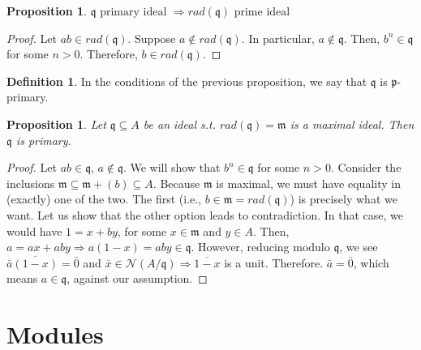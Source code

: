 \documentclass[11pt]{article}
\newtheorem{prop}[theorem]{Proposition}
\theoremstyle{definition}
\newtheorem{defn}[theorem]{Definition}
\begin{document}
        \begin{prop}
            $\mathfrak{q} \text{ primary ideal } \Longrightarrow rad(\mathfrak{q}) \text{ prime ideal }$
        \end{prop}
            \begin{proof}

                Let $ab \in rad(\mathfrak{q})$.
                Suppose $a \notin rad(\mathfrak{q})$.
                In particular, $a \notin \mathfrak{q}$.
                Then, $b^n \in \mathfrak{q}$ for some $n > 0$.
                Therefore, $b \in rad(\mathfrak{q})$.

            \end{proof}

        \begin{defn}
            In the conditions of the previous proposition, we say that $\mathfrak{q}$ is $\mathfrak{p}$-primary.
        \end{defn}

        \begin{prop}
            Let $\mathfrak{q} \subseteq A$ be an ideal s.t. $rad(\mathfrak{q}) = \mathfrak{m}$ is a maximal ideal.
            Then $\mathfrak{q}$ is primary.
        \end{prop}
            \begin{proof}

                Let $ab \in \mathfrak{q}$, $a \notin \mathfrak{q}$.
                We will show that $b^n \in \mathfrak{q}$ for some $n > 0$.
                Consider the inclusions $\mathfrak{m} \subseteq \mathfrak{m} + (b) \subseteq A$.
                Because $\mathfrak{m}$ is maximal, we must have equality in (exactly) one of the two.
                The first (i.e., $b \in \mathfrak{m} = rad(\mathfrak{q})$) 
                is precisely what we want.
                Let us show that the other option leads to contradiction.
                In that case, we would have $1 = x + by$, for some $x \in \mathfrak{m}$ and $y \in A$.
                Then, $a = ax + aby \Rightarrow a(1-x) = aby \in \mathfrak{q}$.
                However, reducing modulo $\mathfrak{q}$, we see $\bar{a}\overline{(1-x)} = \bar{0}$
                and $\overline{x} \in \mathcal{N}(A/\mathfrak{q}) \Rightarrow \overline{1-x}$ is a unit.
                Therefore. $\bar{a} = \bar{0}$, which means $a \in \mathfrak{q}$, against our assumption.


            \end{proof}

    \section{Modules}\label{sec:modules}
\end{document}
